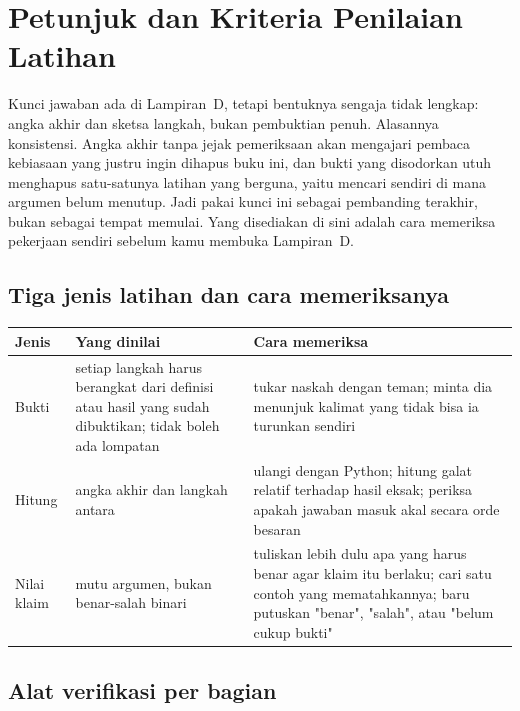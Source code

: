 \documentclass[11pt,a4paper,oneside]{book}
\theoremstyle{definition}
\theoremstyle{plain}
\theoremstyle{remark}
\begin{document}
\chapter{Petunjuk dan Kriteria Penilaian Latihan}
\label{app:petunjuk}

Kunci jawaban ada di Lampiran~D, tetapi bentuknya sengaja tidak lengkap: angka akhir
dan sketsa langkah, bukan pembuktian penuh. Alasannya konsistensi. Angka akhir tanpa
jejak pemeriksaan akan mengajari pembaca kebiasaan yang justru ingin dihapus buku ini,
dan bukti yang disodorkan utuh menghapus satu-satunya latihan yang berguna, yaitu
mencari sendiri di mana argumen belum menutup. Jadi pakai kunci ini sebagai pembanding
terakhir, bukan sebagai tempat memulai. Yang disediakan di sini adalah cara memeriksa
pekerjaan sendiri sebelum kamu membuka Lampiran~D.

\section*{Tiga jenis latihan dan cara memeriksanya}

\begin{center}
\small
\begin{tabular}{@{}p{2.6cm}p{5.6cm}p{5.8cm}@{}}
\toprule
\textbf{Jenis} & \textbf{Yang dinilai} & \textbf{Cara memeriksa} \\
\midrule
Bukti & setiap langkah harus berangkat dari definisi atau hasil yang sudah
  dibuktikan; tidak boleh ada lompatan & tukar naskah dengan teman; minta dia
  menunjuk kalimat yang tidak bisa ia turunkan sendiri \\
Hitung & angka akhir dan langkah antara & ulangi dengan Python; hitung galat
  relatif terhadap hasil eksak; periksa apakah jawaban masuk akal secara
  orde besaran \\
Nilai klaim & mutu argumen, bukan benar-salah binari & tuliskan lebih dulu apa
  yang harus benar agar klaim itu berlaku; cari satu contoh yang mematahkannya;
  baru putuskan "benar", "salah", atau "belum cukup bukti" \\
\bottomrule
\end{tabular}
\end{center}

\section*{Alat verifikasi per bagian}
\end{document}
